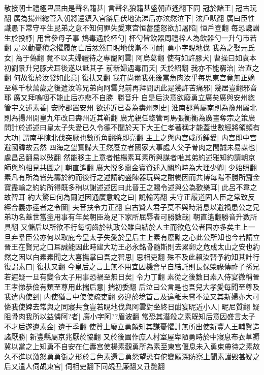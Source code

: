 敬接朝士禮極卑屈由是聲名籍甚|{
	言聲名狼籍甚盛朝直遙翻下同}
冠於諸王|{
	冠古玩翻}
廣為揚州緫管入朝將還鎮入宫辭后伏地流涕后亦泫然泣下|{
	泫戶畎翻}
廣曰臣性識愚下常守平生昆弟之意不知何罪失愛東宫恒蓄盛怒欲加屠陷|{
	恒戶登翻}
每恐讒譛生於投杼|{
	用曾參母子事}
鴆毒遇於杯勺|{
	杯勺皆飲器周禮梓人為飲器勺一升勺市若翻}
是以勤憂積念懼履危亡后忿然曰睍地伐漸不可耐|{
	勇小字睍地伐}
我為之娶元氏女|{
	為于偽翻}
竟不以夫婦禮待之專寵阿雲|{
	阿烏葛翻}
使有如許豚犬|{
	曹操曰如袁本初劉景升兒豚犬耳後遂以詆其子}
前新婦遇毒而夭|{
	夭於紹翻}
我亦不能窮治|{
	治直之翻}
何故復於汝發如此意|{
	復扶又翻}
我在尚爾我死後當魚肉汝乎每思東宫竟無正嫡至尊千秋萬歲之後遣汝等兄弟向阿雲兒前再拜問訊此是幾許苦痛邪|{
	幾居豈翻邪音耶}
廣又拜嗚咽不能止后亦悲不自勝|{
	勝音升}
自是后決意欲廢勇立廣矣廣與安州緫管宇文述素善|{
	安陸郡置安州}
欲述近已奏為夀州刺史|{
	淮南郡舊屬南則為豫州屬北則為揚州開皇九年改曰夀州近其靳翻}
廣尤親任緫管司馬張衡衡為廣畫奪宗之策廣問計於述述曰皇太子失愛已久令德不聞於天下大王仁孝著稱才能蓋世數經將領頻有大功|{
	謂南平陳北伐突厥也數所角翻將即亮翻}
主上之與内宫咸所鍾愛|{
	内宫即中宫避國諱故云然}
四海之望實歸大王然廢立者國家大事處人父子骨肉之間誠未易謀也|{
	處昌呂翻易以䜴翻}
然能移主上意者惟楊素耳素所與謀者唯其弟約述雅知約請朝京師與約相見共圖之|{
	朝直遙翻}
廣大悦多齎金寶資述入關約時為大理少卿|{
	少始照翻}
素凡有所為皆先籌於約而後行之述請約盛陳器玩與之酣暢因而共博每陽不勝所齎金寶盡輸之約約所得既多稍以謝述述因曰此晉王之賜令述與公為歡樂耳|{
	此呂不韋之故智耳}
約大驚曰何為爾述因通廣意說之曰|{
	說輸芮翻}
夫守正履道固人臣之常致反經合義亦逹者之令圖|{
	夫音扶令力正翻}
自古賢人君子莫不與時消息以避禍患公之兄弟功名蓋世當塗用事有年矣朝臣為足下家所屈辱者可勝數哉|{
	朝直遙翻勝音升數所具翻}
又儲后以所欲不行每切齒於執政公雖自結於人主而欲危公者固亦多矣主上一旦弃羣臣公亦何以取庇今皇太子失愛於皇后主上素有廢黜之心此公所知也今若請立晉王在賢兄之口耳誠能因此時建大功王必永銘骨髓斯則去累卵之危成太山之安也約然之因以白素素聞之大喜撫掌曰吾之智思|{
	思相吏翻}
殊不及此賴汝唘予約知其計行復謂素曰|{
	復扶又翻}
今皇后之言上無不用宜因機會早自結託則長保榮祿傳祚子孫兄若遲疑一旦有變令太子用事恐禍至無日矣|{
	令力丁翻}
素從之後數日素入侍宴微稱晉王孝悌恭儉有類至尊用此揣后意|{
	揣初委翻}
后泣曰公言是也吾兒大孝愛每聞至尊及我遣内使到|{
	内使猶言中使使疏吏翻}
必迎於境首言及違離未嘗不泣又其新婦亦大可憐我使婢去常與之同寢共食豈若睍地伐與阿雲對坐終日酣宴昵近小人|{
	昵尼質翻}
疑阻骨肉我所以益憐阿?者|{
	廣小字阿??眉波翻}
常恐其潛殺之素既知后意因盛言太子不才后遂遺素金|{
	遺于季翻}
使贊上廢立勇頗知其謀憂懼計無所出使新豐人王輔賢造諸厭勝|{
	新豐縣屬京兆厭於協翻}
又於後園作庶人村室屋卑陋勇時於中寢息布衣草褥冀以當之上知勇不自安在仁夀宫使楊素觀勇所為素至東宫偃息未入勇束帶待之素故久不進以激怒勇勇衘之形於言色素還言勇怨望恐有佗變願深防察上聞素譖毁甚疑之后又遣人伺覘東宫|{
	伺相吏翻下同覘丑廉翻又丑艷翻}
